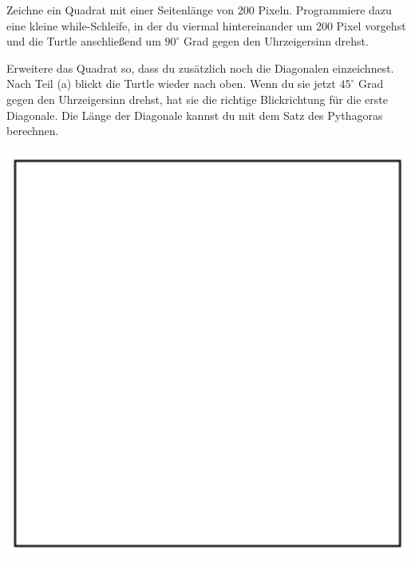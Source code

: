 \begin{minipage}{0.50\textwidth}
\begin{compactenum}[a)]

\item Zeichne ein Quadrat mit einer Seitenlänge von 200 Pixeln.
Programmiere dazu eine kleine while-Schleife, in der du
viermal hintereinander um 200 Pixel vorgehst und die Turtle
anschließend um $90^\circ$ Grad gegen den Uhrzeigersinn drehst.

\item Erweitere das Quadrat so, dass du zusätzlich noch die Diagonalen
einzeichnest. Nach Teil (a) blickt die Turtle wieder nach oben. Wenn du sie
jetzt $45^\circ$ Grad gegen den Uhrzeigersinn drehst, hat sie die richtige
Blickrichtung für die erste Diagonale. Die Länge der Diagonale kannst du mit dem
Satz des Pythagoras berechnen.
\end{compactenum}
\end{minipage}\hfill
\begin{minipage}{0.2\textwidth}
\includegraphics[width=1.0\textwidth]{./inf/SEKII/05_Java_TurtleGrafik/Aufgabe2a.png}
\end{minipage}\hfill
